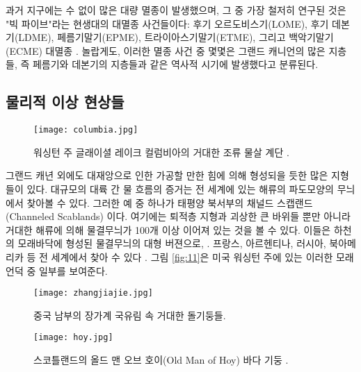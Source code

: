 \documentclass[10pt,twocolumn,letterpaper]{article}
\begin{document}
과거 지구에는 수 없이 많은 대량 멸종이 발생했으며, 그 중 가장 철저히 연구된 것은 "빅 파이브"라는 현생대의 대멸종 사건들이다: 후기 오르도비스기(LOME), 후기 데본기(LDME), 페름기말기(EPME), 트라이아스기말기(ETME), 그리고 백악기말기(ECME) 대멸종 \cite{88,89}. 놀랍게도, 이러한 멸종 사건 중 몇몇은 그랜드 캐니언의 많은 지층들, 즉 페름기와 데본기의  지층들과 같은 역사적 시기에 발생했다고 분류된다.

\subsection{물리적 이상 현상들}

\begin{figure}[b]
\begin{center}
   \texttt{[image: columbia.jpg]}
\end{center}
   \caption{워싱턴 주 글래이셜 레이크 컬럼비아의 거대한 조류 물살 계단 \cite{80}.}
\label{fig:11}
\label{fig:onecol}
\end{figure}

그랜드 캐년 외에도 대재앙으로 인한 가공할 만한 힘에 의해 형성되을 듯한 많은 지형들이 있다. 대규모의 대륙 간 물 흐름의 증거는 전 세계에 있는 해류의 파도모양의 무늬에서 찾아볼 수 있다. 그러한 예 중 하나가 태평양 북서부의 채널드 스캡랜드(Channeled Scablands) 이다. 여기에는 퇴적층 지형과 괴상한  큰 바위들 뿐만 아니라  거대한 해류에 의해 물결무늬가 100개 이상 이어져 있는 것을 볼 수 있다. 이들은 하천의 모래바닥에 형성된 물결무늬의 대형 버젼으로, \cite{78,79}.  프랑스, 아르헨티나, 러시아, 북아메리카 등 전 세계에서 찾아 수 있다 \cite{81}. 그림 \ref{fig:11}은 미국 워싱턴 주에 있는 이러한 모래 언덕 중 일부를 보여준다\cite{80}.

\begin{figure}[t]
\begin{center}
   \texttt{[image: zhangjiajie.jpg]}
\end{center}
   \caption{중국 남부의  장가계 국유림 속 거대한 돌기둥들.}
\label{fig:12}
\label{fig:onecol}
\end{figure}

\begin{figure}[t]
\begin{center}
   \texttt{[image: hoy.jpg]}
\end{center}
   \caption{스코틀랜드의 올드 맨 오브 호이(Old Man of Hoy) 바다 기둥 \cite{83}.}
\label{fig:13}
\label{fig:onecol}
\end{figure}
\end{document}
